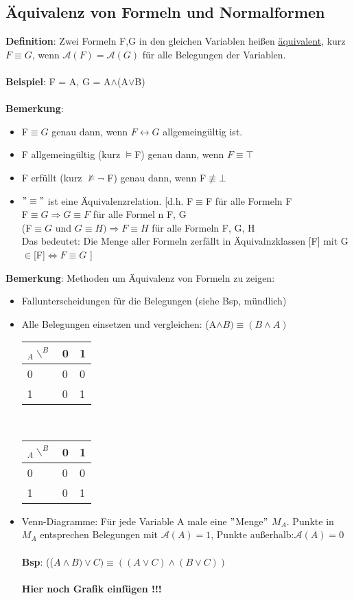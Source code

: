 \documentclass[a4paper]{scrartcl}
\begin{document}
\subsection{Äquivalenz von Formeln und Normalformen}
\textbf{Definition}: Zwei Formeln F,G in den gleichen Variablen heißen \underline{äquivalent}, kurz $F\equiv G$, wenn $\mathcal{A}(F)=\mathcal{A}(G)$ für alle Belegungen der Variablen.\\ \\
\textbf{Beispiel}: F = A, G = A$\land$(A$\lor$B)\\ \\
\textbf{Bemerkung}: \begin{itemize}
\item F$\equiv G$ genau dann, wenn $F\leftrightarrow G$ allgemeingültig ist.
\item F allgemeingültig (kurz $\models$F) genau dann, wenn $F\equiv \top$
\item F erfüllt (kurz $\nvDash \neg $ F) genau dann, wenn F$\not\equiv \bot$
\item $"\equiv "$ ist eine  Äquivalenzrelation. [d.h. F$\equiv$F für alle Formeln F\\
F$\equiv G \Rightarrow G \equiv F$ für alle Formel n F, G\\
(F$\equiv G $ und $G\equiv H)\Rightarrow F \equiv H$ für alle Formeln F, G, H\\
Das bedeutet: Die Menge aller Formeln zerfällt in Äquivalnzklassen [F] mit G$\in$[F]$\Leftrightarrow F\equiv G$ ] \\
\end{itemize} 
\textbf{Bemerkung}: Methoden um Äquivalenz von Formeln zu zeigen:\\
\begin{itemize}
\item Fallunterscheidungen für die Belegungen (siehe Bsp, mündlich)
\item Alle Belegungen einsetzen und vergleichen: (A$\land B ) \equiv (B\land A)$ \\
\begin{tabular}{l|l|l}
$_A\backslash ^B$ & 0 & 1\\ \hline 0 & 0 & 0\\ \hline 1 & 0 & 1\\\end{tabular} ~~~~~~~~~~~~~~~~~
\begin{tabular}{l|l|l}
$_A\backslash ^B$ & 0 & 1 \\ \hline 0 & 0 & 0 \\ \hline 1 & 0 & 1 \end{tabular}
\item Venn-Diagramme: Für jede Variable A male eine $"$Menge$"$ $M_A$. Punkte in $M_A$ entsprechen Belegungen mit $\mathcal{A}(A)=1$, Punkte außerhalb:$\mathcal{A}(A)=0$\\ \\
\textbf{Bsp}: (($A\land B)\lor C ) \equiv ((A\lor C ) \land (B \lor C))$\\ \\
\textbf{Hier noch Grafik einfügen !!!}\\ 
\end{itemize}
\end{document}
